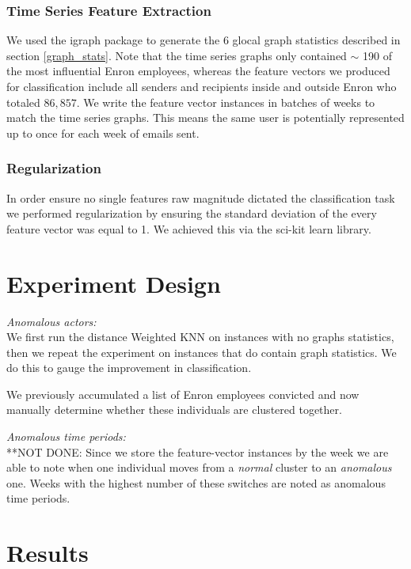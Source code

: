 \documentclass[11pt,letterpaper]{article}
\begin{document}
\subsubsection{Time Series Feature Extraction}
We used the igraph \cite{igraph2006} package to generate the 6 glocal graph statistics
described in section \ref{graph_stats}. Note that the time series graphs only contained 
$\sim$ 190 of the most influential Enron employees, whereas the feature vectors we produced
for classification include all senders and recipients inside and outside Enron who totaled $86,857$.
We write the feature vector instances in batches of weeks to match the time series graphs.
This means the same user is potentially represented up to once for each week of emails sent.

\subsubsection{Regularization}
In order ensure no single features raw magnitude dictated the classification task we performed
regularization by ensuring the standard deviation of the every feature vector was equal to 1.
We achieved this via the sci-kit learn \cite{scikit-learn} library.

\section{Experiment Design}

\hspace*{10pt}\textit{Anomalous actors:} \\
We first run the distance Weighted KNN on instances with no graphs statistics, then we
repeat the experiment on instances that do contain graph statistics. We do this to gauge
the improvement in classification.

We previously accumulated a list of Enron employees convicted and now manually determine
whether these individuals are clustered together.
	
\hspace*{10pt}\textit{Anomalous time periods:} \\
**NOT DONE: Since we store the feature-vector instances by the week we are able to note when one individual
moves from a \textit{normal} cluster to an \textit{anomalous} one. Weeks with the highest
number of these switches are noted as anomalous time periods.

\section{Results}
\end{document}
